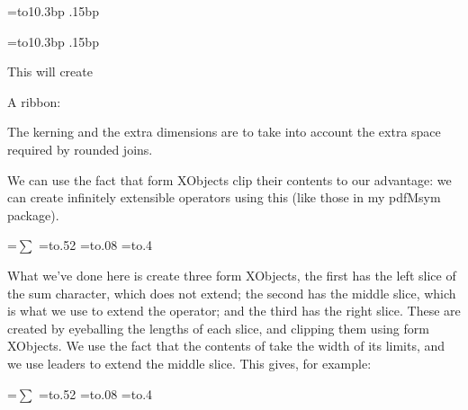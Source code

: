 \blisting
\bgroup
{}=\hbox to10.3bp{\vrule width0bp height10.15bp depth.15bp%
\kern.15bp%
\hfil}
\xdef\ribbon{\pdfrefxform\the\pdflastxform\relax}
\egroup
\elisting

\bgroup
{}=\hbox to10.3bp{\vrule width0bp height10.15bp depth.15bp%
\kern.15bp%
\hfil}
\xdef\ribbon{\pdfrefxform\the\pdflastxform\relax}
\egroup

\noindent This will create

\centerline{A ribbon: \ribbon}

The kerning and the extra dimensions are to take into account the extra space required by rounded joins.

We can use the fact that form XObjects clip their contents to our advantage: we can create infinitely
extensible operators using this (like those in my pdfMsym package).

\blisting
\bgroup
{}=\hbox{$\displaystyle\sum$}
=\hbox to.52
=\hbox to.08
=\hbox to.4
  \xdef\suumL{\the\pdflastxform}
  \xdef\suumC{\the\pdflastxform}
  \xdef\suumR{\the\pdflastxform}
\egroup

\def\suum{%
    \mathop{%
        \pdfrefxform\suumL%
        \xleaders\hbox{\pdfrefxform\suumC}\hfill%
        \pdfrefxform\suumR%
    }\limits%
}
\elisting

\noindent What we've done here is create three form XObjects, the first has the left slice of the sum
character, which does not extend; the second has the middle slice, which is what we use to extend the operator;
and the third has the right slice.
These are created by eyeballing the lengths of each slice, and clipping them using form XObjects.
We use the fact that the contents of \macro\mathop{} take the width of its limits, and we use leaders to
extend the middle slice.
This gives, for example:

\bgroup
{}=\hbox{$\displaystyle\sum$}
=\hbox to.52
=\hbox to.08
=\hbox to.4
  \xdef\suumL{\the\pdflastxform}
  \xdef\suumC{\the\pdflastxform}
  \xdef\suumR{\the\pdflastxform}
\egroup

